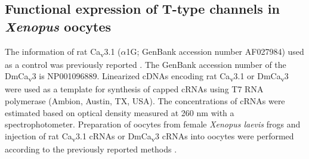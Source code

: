 \subsection*{Functional expression of T-type channels in \emph{Xenopus} oocytes}

The information of rat Ca\textsubscript{v}3.1 ($\alpha$1G; GenBank accession number AF027984) used as a control was previously reported \cite{9495342}.
The GenBank accession number of the DmCa\textsubscript{v}3 is NP001096889.
Linearized cDNAs encoding rat Ca\textsubscript{v}3.1 or DmCa\textsubscript{v}3 were used as a template for synthesis of capped cRNAs using T7 RNA polymerase (Ambion, Austin, TX, USA).
The concentrations of cRNAs were estimated based on optical density measured at 260 nm with a spectrophotometer.
Preparation of oocytes from female \emph{Xenopus laevis} frogs and injection of rat Ca\textsubscript{v}3.1 cRNAs or DmCa\textsubscript{v}3 cRNAs into oocytes were performed according to the previously reported methods \cite{16377633}.
    
    
  
  
  